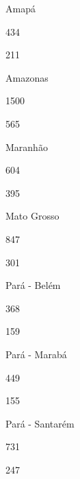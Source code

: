 \documentclass[
  letterpaper,
]{report}
\begin{document}
Amapá

\n      

434

\n      

211

\n    

\n    

\n      

Amazonas

\n      

1500

\n      

565

\n    

\n    

\n      

Maranhão

\n      

604

\n      

395

\n    

\n    

\n      

Mato Grosso

\n      

847

\n      

301

\n    

\n    

\n      

Pará - Belém

\n      

368

\n      

159

\n    

\n    

\n      

Pará - Marabá

\n      

449

\n      

155

\n    

\n    

\n      

Pará - Santarém

\n      

731

\n      

247

\n    
\end{document}

